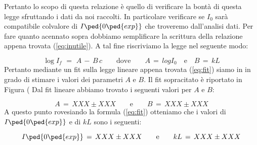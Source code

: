 Pertanto lo scopo di questa relazione è quello di verificare la bontà di questa legge sfruttando i dati da noi raccolti. In particolare verificare se $I_0$ sarà compatibile colvalore di $I\ped{0\ped{exp}}$ che troveremo dall'analisi dati.
Per fare quanto acennato sopra dobbiamo semplificare la scrittura della relazione appena trovata (\ref{eq:inutile}).
A tal fine riscriviamo la legge nel seguente modo:

\begin{equation}
	\log{I_f} \,\,=\,\, A \,-\, B \, c \qquad \text{dove} \qquad A \,=\, log{I_0} \quad \text{e} \quad B\,=\, kL
	\label{eq:fit}
\end{equation}
%
Pertanto mediante un fit sulla legge lineare appena trovata (\ref{eq:fit}) siamo in in grado di stimare i valori dei parametri
$A$ e $B$. Il fit sopracitato è riportato in Figura (%
Dal fit lineare abbiamo trovato i seguenti valori per $A$ e $B$:

\begin{equation*}
	A \,=\, XXX \pm XXX \qquad \text{e} \qquad B \,=\, XXX \pm XXX
\end{equation*}
%
A questo punto rovesiando la formula (\ref{eq:fit}) otteniamo che i valori di $I\ped{0\ped{exp}}$ e di $kL$ sono i seguenti:

\begin{equation}
	I\ped{0\ped{exp}} \,=\, XXX \pm XXX \qquad \text{e} \qquad kL \,=\, XXX \pm XXX
\end{equation}
%






%


 
